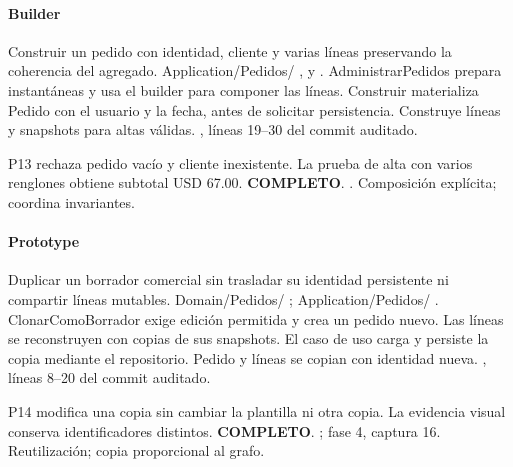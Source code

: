 \paragraph{Builder}
 Construir un pedido con identidad, cliente y varias líneas preservando la coherencia del agregado.
 Application/Pedidos/ ,  y . AdministrarPedidos prepara instantáneas y usa el builder para componer las líneas. Construir materializa Pedido con el usuario y la fecha, antes de solicitar persistencia.
 Construye líneas y snapshots para altas válidas.
 , líneas 19--30 del commit auditado.

 P13 rechaza pedido vacío y cliente inexistente. La prueba de alta con varios renglones obtiene subtotal USD 67.00. \textbf{COMPLETO}.
 .
 Composición explícita; coordina invariantes.
\medskip
\clearpage
\paragraph{Prototype}
 Duplicar un borrador comercial sin trasladar su identidad persistente ni compartir líneas mutables.
 Domain/Pedidos/ ; Application/Pedidos/ . ClonarComoBorrador exige edición permitida y crea un pedido nuevo. Las líneas se reconstruyen con copias de sus snapshots. El caso de uso carga y persiste la copia mediante el repositorio.
 Pedido y líneas se copian con identidad nueva.
 , líneas 8--20 del commit auditado.

 P14 modifica una copia sin cambiar la plantilla ni otra copia. La evidencia visual conserva identificadores distintos. \textbf{COMPLETO}.
 ; fase 4, captura 16.
 Reutilización; copia proporcional al grafo.
\medskip
\clearpage
